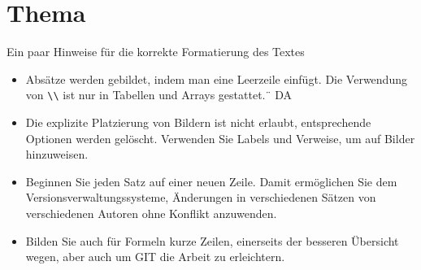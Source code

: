 %
%
%
%
\chapter{Thema\label{chapter:parallelisierung}}
\begin{refsection}

Ein paar Hinweise für die korrekte Formatierung des Textes
\begin{itemize}
\item
Absätze werden gebildet, indem man eine Leerzeile einfügt.
Die Verwendung von \verb+\\+ ist nur in Tabellen und Arrays gestattet.¨ DA
\item
Die explizite Platzierung von Bildern ist nicht erlaubt, entsprechende
Optionen werden gelöscht. 
Verwenden Sie Labels und Verweise, um auf Bilder hinzuweisen.
\item
Beginnen Sie jeden Satz auf einer neuen Zeile. 
Damit ermöglichen Sie dem Versionsverwaltungssysteme, Änderungen
in verschiedenen Sätzen von verschiedenen Autoren ohne Konflikt 
anzuwenden.
\item 
Bilden Sie auch für Formeln kurze Zeilen, einerseits der besseren
Übersicht wegen, aber auch um GIT die Arbeit zu erleichtern.
\end{itemize}






\printbibliography[heading=subbibliography]
\end{refsection}
